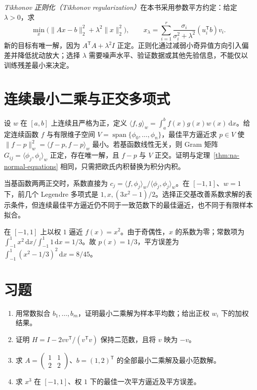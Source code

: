 \emph{Tikhonov 正则化（Tikhonov regularization）}在本书采用参数平方约定：给定 $\lambda>0$，求
\[
 \min_x\bigl(\|Ax-b\|_2^2+\lambda^2\|x\|_2^2\bigr),\qquad
 x_\lambda=\sum_{i=1}^r\frac{\sigma_i}{\sigma_i^2+\lambda^2}(u_i^{\mathsf T}b)v_i.
\]
新的目标有唯一解，因为 $A^{\mathsf T}A+\lambda^2I$ 正定。正则化通过减弱小奇异值方向引入偏差并降低扰动放大；选择 $\lambda$ 需要噪声水平、验证数据或其他先验信息，不能仅以训练残差最小来决定。

\section{连续最小二乘与正交多项式}
设 $w$ 在 $[a,b]$ 上连续且严格为正，定义 $\langle f,g\rangle_w=\int_a^b f(x)g(x)w(x)\,\mathrm dx$。给定连续函数 $f$ 与有限维子空间 $V=\operatorname{span}\{\phi_0,\ldots,\phi_n\}$，最佳平方逼近求 $p\in V$ 使 $\|f-p\|_w^2=\langle f-p,f-p\rangle_w$ 最小。若基函数线性无关，则 Gram 矩阵 $G_{ij}=\langle\phi_j,\phi_i\rangle_w$ 正定，存在唯一解，且 $f-p$ 与 $V$ 正交。证明与定理~\ref{thm:na-normal-equations} 相同，只需把欧氏内积替换为积分内积。

当基函数两两正交时，系数直接为 $c_j=\langle f,\phi_j\rangle_w/\langle\phi_j,\phi_j\rangle_w$。在 $[-1,1]$、$w=1$ 下，前几个 Legendre 多项式是 $1,x,(3x^2-1)/2$。选择正交基改善系数求解的表示条件，但连续最佳平方逼近仍不同于一致范数下的最佳逼近，也不同于有限样本拟合。

\begin{example}[平方函数的最佳一次平方逼近]
在 $[-1,1]$ 上以权 $1$ 逼近 $f(x)=x^2$。由于奇偶性，$x$ 的系数为零；常数项为 $\int_{-1}^1x^2\,\mathrm dx/\int_{-1}^1 1\,\mathrm dx=1/3$。故 $p(x)=1/3$，平方误差为 $\int_{-1}^1(x^2-1/3)^2\,\mathrm dx=8/45$。
\end{example}

\section{习题}
\begin{enumerate}[label=\arabic*.]
\item\label{exr:na-ls-constant} 用常数拟合 $b_1,\ldots,b_m$，证明最小二乘解为样本平均数；给出正权 $w_i$ 下的加权结果。
\item\label{exr:na-ls-householder} 证明 $H=I-2vv^{\mathsf T}/(v^{\mathsf T}v)$ 保持二范数，且将 $v$ 映为 $-v$。
\item\label{exr:na-ls-rank} 求 $A=\begin{pmatrix}1&1\\2&2\end{pmatrix}$、$b=(1,2)^{\mathsf T}$ 的全部最小二乘解及最小范数解。
\item\label{exr:na-ls-projection} 求 $x^3$ 在 $[-1,1]$、权 $1$ 下的最佳一次平方逼近及平方误差。
\end{enumerate}

